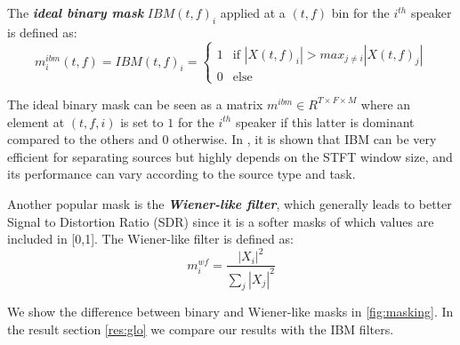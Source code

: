 \documentclass[master, tikz, final,11pt, dvipdfmx]{iscs-thesis}
\begin{document}
The \textit{\textbf{ideal binary mask}} $IBM(t,f)_i$ applied at a $(t,f)$ bin for the $i^{th}$ speaker is defined as:
\[
m^{ibm}_i(t,f) = IBM(t,f)_i = \left\{
    \begin{array}{ll}
        1 & \mbox{if } |X(t,f)_i| > max_{j \neq i} |X(t,f)_j| \\
        0 & \mbox{else}
    \end{array}
\right.
\]

The ideal binary mask can be seen as a matrix $m^{ibm} \in R^{T\times F \times M}$ where an element at $(t,f,i)$ is set to $1$ for the $i^{th}$ speaker if this latter is dominant compared to the others and $0$ otherwise. In \cite{IBM}, it is shown that IBM can be very efficient for separating sources but highly depends on the STFT window size, and its performance can vary according to the source type and task.

Another popular mask is the \textit{\textbf{Wiener-like filter}}, which generally leads to better Signal to Distortion Ratio (SDR) since it is a softer masks of which values are included in [0,1]. The Wiener-like filter is defined as:
\[
m^{wf}_i = \frac{|X_i|^2}{\sum_j{|X_j|^2}} 
\]

We show the difference between binary and Wiener-like masks in \autoref{fig:masking}.
In the result section \ref{res:glo} we compare our results with the IBM filters.
\end{document}
